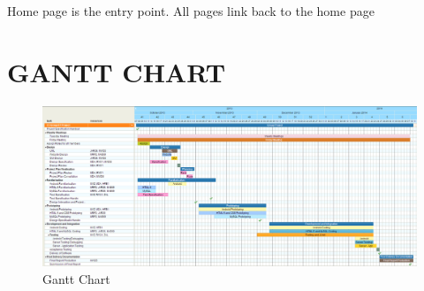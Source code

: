 \documentclass[12pt]{article}
\begin{document}
\par{Home page is the entry point. All pages link back to the home page}
\newpage
\section{GANTT CHART}
	\begin{figure}[htp]
	\begin{adjustwidth}{-3.cm}{}
\centering
\includegraphics[scale=0.42]{Project_Plan/docs/gant_chart_01.PNG}
\caption{Gantt Chart}
\label{Gantt Chart}
\end{adjustwidth}
\end{figure}
	
\newpage
\end{document}
